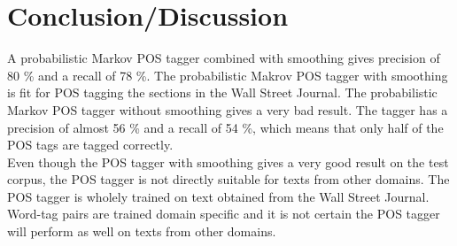\documentclass[10pt, a4paper]{article}
\begin{document}
\section*{Conclusion/Discussion}
A probabilistic Markov POS tagger combined with smoothing gives precision of 80 \% and a recall of 78 \%. The probabilistic Makrov POS tagger with smoothing is fit for POS tagging the sections in the Wall Street Journal. The probabilistic Markov POS tagger without smoothing gives a very bad result. The tagger has a precision of almost 56 \% and a recall of 54 \%, which means that only half of the POS tags are tagged correctly. \\
Even though the POS tagger with smoothing gives a very good result on the test corpus, the POS tagger is not directly suitable for texts from other domains. The POS tagger is wholely trained on text obtained from the Wall Street Journal. Word-tag pairs are trained domain specific and it is not certain the POS tagger will perform as well on texts from other domains.
\end{document}
